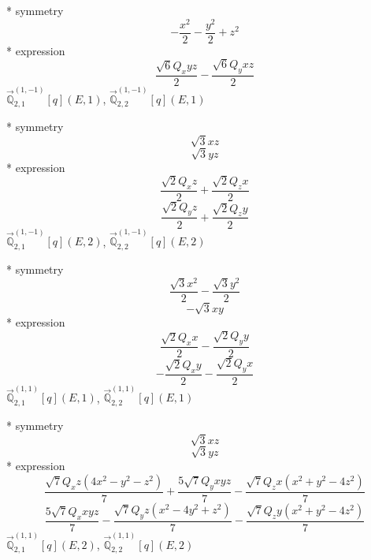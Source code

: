 \documentclass[fleqn,8pt]{jsarticle}
\begin{document}
\noindent\quad ** symmetry
\begin{dmath*}
- \frac{x^{2}}{2} - \frac{y^{2}}{2} + z^{2}
\end{dmath*}
\noindent\quad ** expression
\begin{dmath*}
\frac{\sqrt{6} Q_{x} y z}{2} - \frac{\sqrt{6} Q_{y} x z}{2}
\end{dmath*}
\noindent\quad $\vec{\mathbb{Q}}_{2,1}^{(1,-1)}[q](E,1)$, $\vec{\mathbb{Q}}_{2,2}^{(1,-1)}[q](E,1)$

\noindent\quad ** symmetry
\begin{dmath*}
\sqrt{3} x z
\end{dmath*}
\begin{dmath*}
\sqrt{3} y z
\end{dmath*}
\noindent\quad ** expression
\begin{dmath*}
\frac{\sqrt{2} Q_{x} z}{2} + \frac{\sqrt{2} Q_{z} x}{2}
\end{dmath*}
\begin{dmath*}
\frac{\sqrt{2} Q_{y} z}{2} + \frac{\sqrt{2} Q_{z} y}{2}
\end{dmath*}
\noindent\quad $\vec{\mathbb{Q}}_{2,1}^{(1,-1)}[q](E,2)$, $\vec{\mathbb{Q}}_{2,2}^{(1,-1)}[q](E,2)$

\noindent\quad ** symmetry
\begin{dmath*}
\frac{\sqrt{3} x^{2}}{2} - \frac{\sqrt{3} y^{2}}{2}
\end{dmath*}
\begin{dmath*}
- \sqrt{3} x y
\end{dmath*}
\noindent\quad ** expression
\begin{dmath*}
\frac{\sqrt{2} Q_{x} x}{2} - \frac{\sqrt{2} Q_{y} y}{2}
\end{dmath*}
\begin{dmath*}
- \frac{\sqrt{2} Q_{x} y}{2} - \frac{\sqrt{2} Q_{y} x}{2}
\end{dmath*}
\noindent\quad $\vec{\mathbb{Q}}_{2,1}^{(1,1)}[q](E,1)$, $\vec{\mathbb{Q}}_{2,2}^{(1,1)}[q](E,1)$

\noindent\quad ** symmetry
\begin{dmath*}
\sqrt{3} x z
\end{dmath*}
\begin{dmath*}
\sqrt{3} y z
\end{dmath*}
\noindent\quad ** expression
\begin{dmath*}
\frac{\sqrt{7} Q_{x} z \left(4 x^{2} - y^{2} - z^{2}\right)}{7} + \frac{5 \sqrt{7} Q_{y} x y z}{7} - \frac{\sqrt{7} Q_{z} x \left(x^{2} + y^{2} - 4 z^{2}\right)}{7}
\end{dmath*}
\begin{dmath*}
\frac{5 \sqrt{7} Q_{x} x y z}{7} - \frac{\sqrt{7} Q_{y} z \left(x^{2} - 4 y^{2} + z^{2}\right)}{7} - \frac{\sqrt{7} Q_{z} y \left(x^{2} + y^{2} - 4 z^{2}\right)}{7}
\end{dmath*}
\noindent\quad $\vec{\mathbb{Q}}_{2,1}^{(1,1)}[q](E,2)$, $\vec{\mathbb{Q}}_{2,2}^{(1,1)}[q](E,2)$
\end{document}
